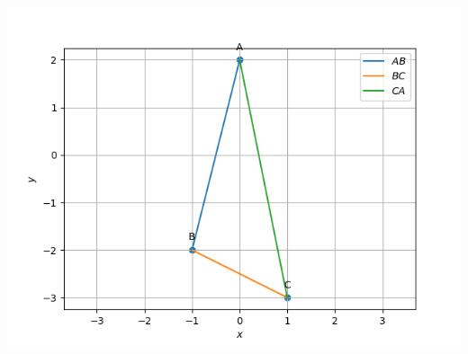 \documentclass[article,12pt]{IEEEtran}
\begin{document}
\includegraphics[width=\columnwidth]{./figures/triangle.png}
\newpage
\end{document}
